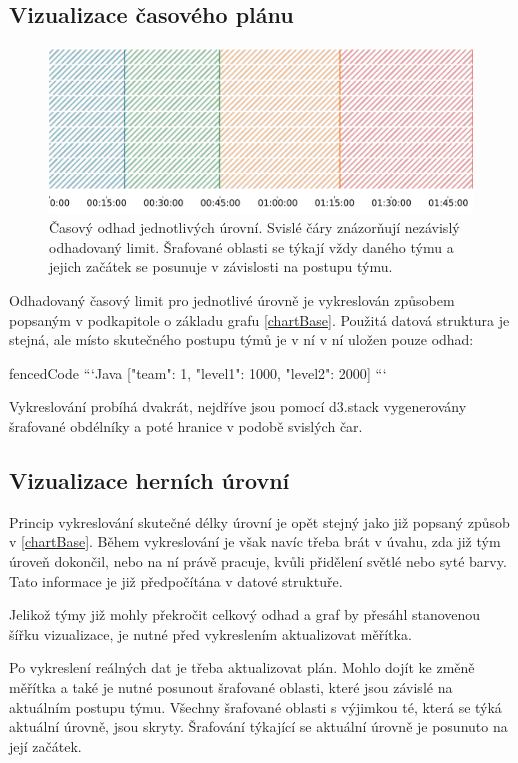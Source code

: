 \documentclass[
  digital, %
  oneside, %
  table,   %
  nolof,     %
  nolot,     %
]{fithesis3}
\begin{document}
\subsection{Vizualizace časového plánu}
\begin{figure}[H]
  \begin{center}
    \includegraphics[width=12.7cm]{images/ctf-plan.pdf}
  \end{center}
  \caption{Časový odhad jednotlivých úrovní. Svislé čáry znázorňují nezávislý odhadovaný limit. Šrafované oblasti se týkají vždy daného týmu a jejich začátek se posunuje v závislosti na postupu týmu.}
  \label{fig:visualizationChart}
\end{figure}
Odhadovaný časový limit pro jednotlivé úrovně je vykreslován způsobem popsaným v podkapitole o základu grafu \ref{chartBase}. Použitá datová struktura je stejná, ale místo skutečného postupu týmů je v ní v ní uložen pouze odhad:
\begin{markdown*}{
  fencedCode
}
```Java
[{"team": 1, "level1": 1000, "level2": 2000}]
```
\end{markdown*}
Vykreslování probíhá dvakrát, nejdříve jsou pomocí d3.stack vygenerovány šrafované obdélníky a poté hranice v podobě svislých čar.

\subsection{Vizualizace herních úrovní}
Princip vykreslování skutečné délky úrovní je opět stejný jako již popsaný způsob v \ref{chartBase}. Během vykreslování je však navíc třeba brát v úvahu, zda již tým úroveň dokončil, nebo na ní právě pracuje, kvůli přidělení světlé nebo syté barvy. Tato informace je již předpočítána v datové struktuře.\par
Jelikož týmy již mohly překročit celkový odhad a graf by přesáhl stanovenou šířku vizualizace, je nutné před vykreslením aktualizovat měřítka.\par
Po vykreslení reálných dat je třeba aktualizovat plán. Mohlo dojít ke změně měřítka a také je nutné posunout šrafované oblasti, které jsou závislé na aktuálním postupu týmu. Všechny šrafované oblasti s výjimkou té, která se týká aktuální úrovně, jsou skryty. Šrafování týkající se aktuální úrovně je posunuto na její začátek.
\end{document}
